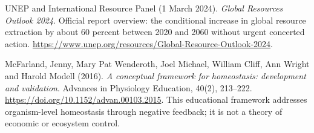  UNEP and International Resource Panel
(1 March 2024). \textit{Global Resources Outlook 2024}. Official report
overview: the conditional increase in global resource extraction by about
60 percent between 2020 and 2060 without urgent concerted action.
\url{https://www.unep.org/resources/Global-Resource-Outlook-2024}.

 McFarland, Jenny, Mary Pat Wenderoth,
Joel Michael, William Cliff, Ann Wright and Harold Modell (2016).
\textit{A conceptual framework for homeostasis: development and validation}.
Advances in Physiology Education, 40(2), 213--222.
\url{https://doi.org/10.1152/advan.00103.2015}.
This educational framework addresses organism-level homeostasis through
negative feedback; it is not a theory of economic or ecosystem control.
